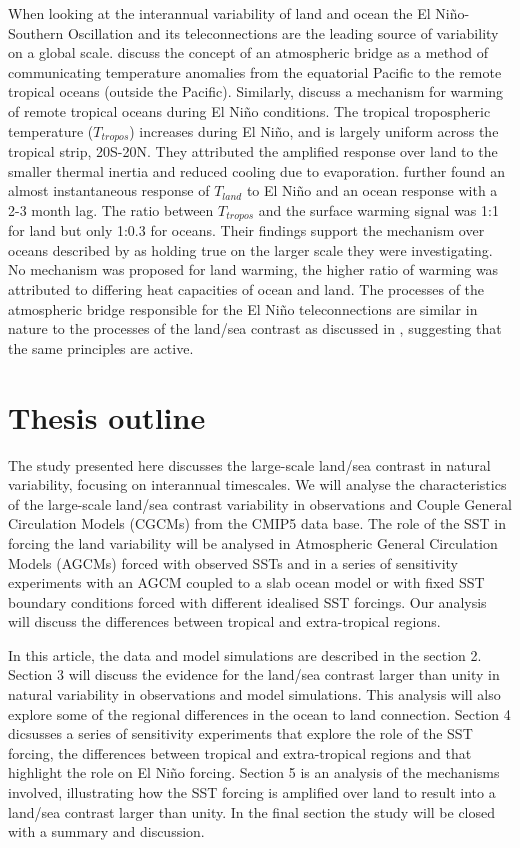 When looking at the interannual variability of land and ocean the El 
Ni{\~n}o-Southern Oscillation and its teleconnections are the leading source of 
variability on a global scale. \citet*{Klein1999} discuss the concept of an 
atmospheric bridge as a method of communicating temperature anomalies from the 
equatorial Pacific to the remote tropical oceans (outside the Pacific).  
Similarly, \citet*{Chiang2002} discuss a mechanism for warming of remote 
tropical oceans during El Ni{\~n}o conditions. The tropical tropospheric 
temperature ($T_{tropos}$) increases during El Ni{\~n}o, and is largely uniform 
across the tropical strip, 20S-20N.  They attributed the amplified response over 
land to the smaller thermal inertia and reduced cooling due to evaporation.  
\citet*{Chiang2005} further found an almost instantaneous response of $T_{land}$ 
to  El Ni{\~n}o and an ocean response with a 2-3 month lag.  The ratio between 
$T_{tropos}$ and the surface warming signal was 1:1 for land but only 1:0.3 for 
oceans.  Their findings support the mechanism over oceans described by 
\citet*{Chiang2002} as holding true on the larger scale they were investigating.  
No mechanism was proposed for land warming, the higher ratio of warming was 
attributed to differing heat capacities of ocean and land. The processes of the 
atmospheric bridge responsible for the El Ni{\~n}o teleconnections are similar 
in nature to the processes of the land/sea contrast as discussed in 
\citet{Joshi2008}, suggesting that the same principles are active.

\section{Thesis outline}

The study presented here discusses the large-scale land/sea contrast in natural 
variability, focusing on interannual timescales. We will analyse the 
characteristics of the large-scale land/sea contrast variability in observations 
and Couple General Circulation Models (CGCMs) from the CMIP5 data base. The role 
of the SST in forcing the land variability will be analysed in Atmospheric 
General Circulation Models (AGCMs) forced with observed SSTs and in a series of 
sensitivity experiments with an AGCM coupled to a slab ocean model or with fixed 
SST boundary conditions forced with different idealised SST forcings.  Our 
analysis will discuss the differences between tropical and extra-tropical 
regions.

In this article, the data and model simulations are described in the section 
2. Section 3 will discuss the evidence for the land/sea contrast larger than
unity in natural variability in observations and model simulations. This 
analysis will also explore some of the regional differences in the ocean to land 
connection. Section 4 dicsusses a series of sensitivity experiments that explore 
the role of the SST forcing, the differences between tropical and extra-tropical 
regions and that highlight the role on El Ni{\~n}o forcing.  Section 5 is an 
analysis of the mechanisms involved, illustrating how the SST forcing is 
amplified over land to result into a land/sea contrast larger than unity. In the 
final section the study will be closed with a summary and discussion.